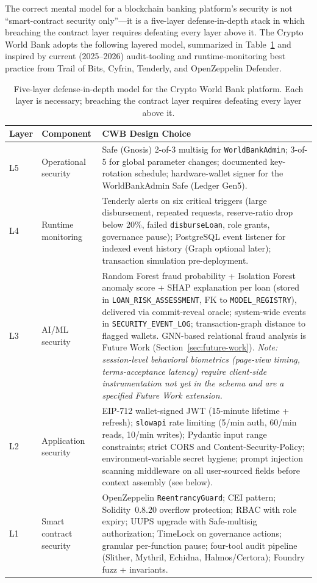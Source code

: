 \documentclass[12pt,a4paper]{report}
\newcommand{\tableheadcolor}{\rowcolor{TableHeadBg}}
\begin{document}
The correct mental model for a blockchain banking platform's security is not ``smart-contract security only''---it is a five-layer defense-in-depth stack in which breaching the contract layer requires defeating every layer above it. The Crypto World Bank adopts the following layered model, summarized in Table~\ref{tab:defense-layers} and inspired by current (2025--2026) audit-tooling and runtime-monitoring best practice from Trail of Bits, Cyfrin, Tenderly, and OpenZeppelin Defender.

\begin{table}[H]
\centering
\caption[Five-layer defense-in-depth model]{Five-layer defense-in-depth model for the Crypto World Bank platform. Each layer is necessary; breaching the contract layer requires defeating every layer above it.}
\label{tab:defense-layers}
\begin{tabular}{p{1.4cm}p{4.0cm}p{8.5cm}}
\toprule
\tableheadcolor
\textbf{Layer} & \textbf{Component} & \textbf{CWB Design Choice} \\
\midrule
L5 & Operational security & Safe (Gnosis) 2-of-3 multisig for \texttt{WorldBankAdmin}; 3-of-5 for global parameter changes; documented key-rotation schedule; hardware-wallet signer for the WorldBankAdmin Safe (Ledger Gen5). \\
L4 & Runtime monitoring & Tenderly alerts on six critical triggers (large disbursement, repeated requests, reserve-ratio drop below 20\%, failed \texttt{disburseLoan}, role grants, governance pause); PostgreSQL event listener for indexed event history (Graph optional later); transaction simulation pre-deployment. \\
L3 & AI/ML security & Random Forest fraud probability + Isolation Forest anomaly score + SHAP explanation per loan (stored in \texttt{LOAN\_RISK\_ASSESSMENT}, FK to \texttt{MODEL\_REGISTRY}), delivered via commit-reveal oracle; system-wide events in \texttt{SECURITY\_EVENT\_LOG}; transaction-graph distance to flagged wallets. GNN-based relational fraud analysis is Future Work (Section~\ref{sec:future-work}). \textit{Note: session-level behavioral biometrics (page-view timing, terms-acceptance latency) require client-side instrumentation not yet in the schema and are a specified Future Work extension.} \\
L2 & Application security & EIP-712 wallet-signed JWT (15-minute lifetime + refresh); \texttt{slowapi} rate limiting (5/min auth, 60/min reads, 10/min writes); Pydantic input range constraints; strict CORS and Content-Security-Policy; environment-variable secret hygiene; prompt injection scanning middleware on all user-sourced fields before context assembly (see below). \\
L1 & Smart contract security & OpenZeppelin \texttt{ReentrancyGuard}; CEI pattern; Solidity~0.8.20 overflow protection; RBAC with role expiry; UUPS upgrade with Safe-multisig authorization; TimeLock on governance actions; granular per-function pause; four-tool audit pipeline (Slither, Mythril, Echidna, Halmos/Certora); Foundry fuzz + invariants. \\
\bottomrule
\end{tabular}
\end{table}
\end{document}
